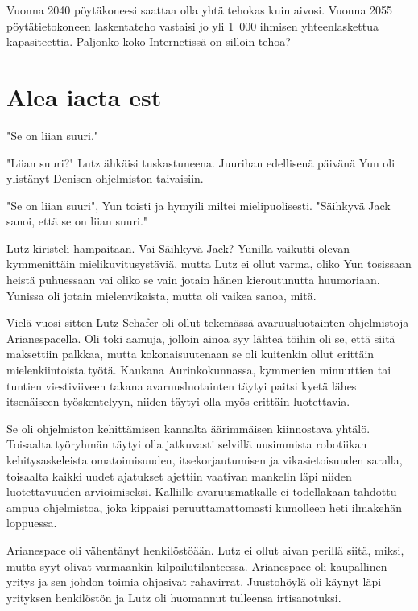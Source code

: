 Vuonna 2040 pöytäkoneesi saattaa olla yhtä tehokas kuin aivosi. Vuonna 2055 pöytätietokoneen laskentateho vastaisi jo yli 1~000 ihmisen yhteenlaskettua kapasiteettia. Paljonko koko Internetissä on silloin tehoa?








\chapter{Alea iacta est}"Se on liian suuri."


"Liian suuri?" Lutz ähkäisi tuskastuneena. Juurihan edellisenä päivänä Yun oli ylistänyt Denisen ohjelmiston taivaisiin.


"Se on liian suuri", Yun toisti ja hymyili miltei mielipuolisesti. "Säihkyvä Jack sanoi, että se on liian suuri."


Lutz kiristeli hampaitaan. Vai Säihkyvä Jack? Yunilla vaikutti olevan kymmenittäin mielikuvitusystäviä, mutta Lutz ei ollut varma, oliko Yun tosissaan heistä puhuessaan vai oliko se vain jotain hänen kieroutunutta huumoriaan. Yunissa oli jotain mielenvikaista, mutta oli vaikea sanoa, mitä.




\psep Vielä vuosi sitten Lutz Schafer oli ollut tekemässä avaruusluotainten ohjelmistoja Arianespacella. Oli toki aamuja, jolloin ainoa syy lähteä töihin oli se, että siitä maksettiin palkkaa, mutta kokonaisuutenaan se oli kuitenkin ollut erittäin mielenkiintoista työtä. Kaukana Aurinkokunnassa, kymmenien minuuttien tai tuntien viestiviiveen takana avaruusluotainten täytyi paitsi kyetä lähes itsenäiseen työskentelyyn, niiden täytyi olla myös erittäin luotettavia.


Se oli ohjelmiston kehittämisen kannalta äärimmäisen kiinnostava yhtälö. Toisaalta työryhmän täytyi olla jatkuvasti selvillä uusimmista robotiikan kehitysaskeleista omatoimisuuden, itsekorjautumisen ja vikasietoisuuden saralla, toisaalta kaikki uudet ajatukset ajettiin vaativan mankelin läpi niiden luotettavuuden arvioimiseksi. Kalliille avaruusmatkalle ei todellakaan tahdottu ampua ohjelmistoa, joka kippaisi peruuttamattomasti kumolleen heti ilmakehän loppuessa.


Arianespace oli vähentänyt henkilöstöään. Lutz ei ollut aivan perillä siitä, miksi, mutta syyt olivat varmaankin kilpailutilanteessa. Arianespace oli kaupallinen yritys ja sen johdon toimia ohjasivat rahavirrat. Juustohöylä oli käynyt läpi yrityksen henkilöstön ja Lutz oli huomannut tulleensa irtisanotuksi.


